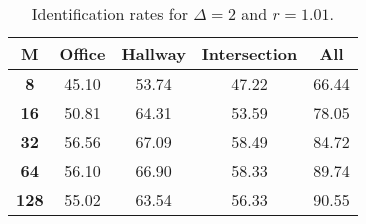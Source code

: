 \begin{table}[h]
    \footnotesize
    \centering
    \begin{tabular}{|c|c|c|c|l|}    
    \hline
    {\bf M} & {\bf Office} & {\bf Hallway} & {\bf Intersection} &     \multicolumn{1}{c|}{{\bf All}} \\ \hline
    {\bf 8} & 45.10 & 53.74 & 47.22 & 66.44 \\ \hline
    {\bf 16} & 50.81 & 64.31 & 53.59 & 78.05 \\ \hline
    {\bf 32} & 56.56 & 67.09 & 58.49 & 84.72 \\ \hline
    {\bf 64} & 56.10 & 66.90 & 58.33 & 89.74 \\ \hline
    {\bf 128} & 55.02 & 63.54 & 56.33 & 90.55 \\ \hline
    \end{tabular}
    \caption{Identification rates for $\Delta = 2$ and $r = 1.01$.}    
    \label{tab:identify_speakers_1.01_mit_19_2}
\end{table}
